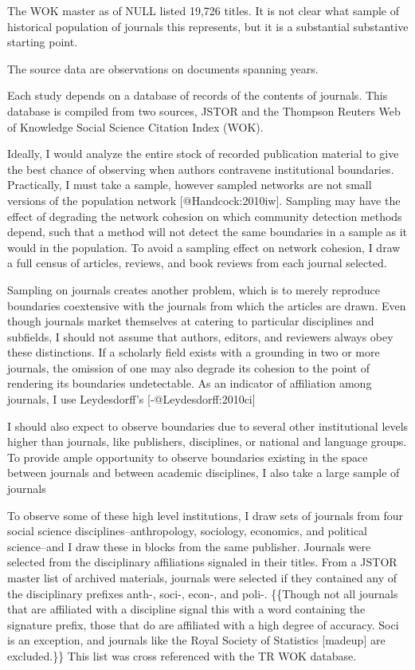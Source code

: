 \documentclass[]{article}
\begin{document}
The WOK master as of NULL listed 19,726 titles. It is not clear what
sample of historical population of journals this represents, but it is a
substantial substantive starting point.

The source data are observations on documents spanning years.

Each study depends on a database of records of the contents of journals.
This database is compiled from two sources, JSTOR and the Thompson
Reuters Web of Knowledge Social Science Citation Index (WOK).

Ideally, I would analyze the entire stock of recorded publication
material to give the best chance of observing when authors contravene
institutional boundaries. Practically, I must take a sample, however
sampled networks are not small versions of the population network
{[}@Handcock:2010iw{]}. Sampling may have the effect of degrading the
network cohesion on which community detection methods depend, such that
a method will not detect the same boundaries in a sample as it would in
the population. To avoid a sampling effect on network cohesion, I draw a
full census of articles, reviews, and book reviews from each journal
selected.

Sampling on journals creates another problem, which is to merely
reproduce boundaries coextensive with the journals from which the
articles are drawn. Even though journals market themselves at catering
to particular disciplines and subfields, I should not assume that
authors, editors, and reviewers always obey these distinctions. If a
scholarly field exists with a grounding in two or more journals, the
omission of one may also degrade its cohesion to the point of rendering
its boundaries undetectable. As an indicator of affiliation among
journals, I use Leydesdorff's {[}-@Leydesdorff:2010ci{]}

I should also expect to observe boundaries due to several other
institutional levels higher than journals, like publishers, disciplines,
or national and language groups. To provide ample opportunity to observe
boundaries existing in the space between journals and between academic
disciplines, I also take a large sample of journals

To observe some of these high level institutions, I draw sets of
journals from four social science disciplines--anthropology, sociology,
economics, and political science--and I draw these in blocks from the
same publisher. Journals were selected from the disciplinary
affiliations signaled in their titles. From a JSTOR master list of
archived materials, journals were selected if they contained any of the
disciplinary prefixes anth-, soci-, econ-, and poli-. \{\{Though not all
journals that are affiliated with a discipline signal this with a word
containing the signature prefix, those that do are affiliated with a
high degree of accuracy. Soci is an exception, and journals like the
Royal Society of Statistics {[}madeup{]} are excluded.\}\} This list was
cross referenced with the TR WOK database.
\end{document}
